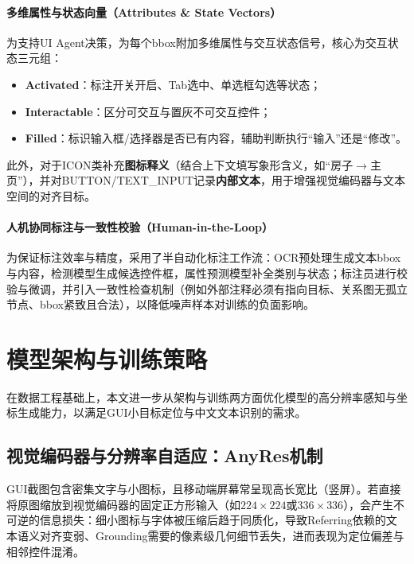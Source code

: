 \paragraph{多维属性与状态向量（Attributes \& State Vectors）}
为支持UI Agent决策，为每个bbox附加多维属性与交互状态信号，核心为交互状态三元组：
\begin{itemize}
  \item \textbf{Activated}：标注开关开启、Tab选中、单选框勾选等状态；
  \item \textbf{Interactable}：区分可交互与置灰不可交互控件；
  \item \textbf{Filled}：标识输入框/选择器是否已有内容，辅助判断执行“输入”还是“修改”。
\end{itemize}
此外，对于ICON类补充\textbf{图标释义}（结合上下文填写象形含义，如“房子$\rightarrow$主页”），并对BUTTON/TEXT\_INPUT记录\textbf{内部文本}，用于增强视觉编码器与文本空间的对齐目标。

\paragraph{人机协同标注与一致性校验（Human-in-the-Loop）}
为保证标注效率与精度，采用了半自动化标注工作流：OCR预处理生成文本bbox与内容，检测模型生成候选控件框，属性预测模型补全类别与状态；标注员进行校验与微调，并引入一致性检查机制（例如外部注释必须有指向目标、关系图无孤立节点、bbox紧致且合法），以降低噪声样本对训练的负面影响。

\section{模型架构与训练策略}
在数据工程基础上，本文进一步从架构与训练两方面优化模型的高分辨率感知与坐标生成能力，以满足GUI小目标定位与中文文本识别的需求。

\subsection{视觉编码器与分辨率自适应：AnyRes机制}
GUI截图包含密集文字与小图标，且移动端屏幕常呈现高长宽比（竖屏）。若直接将原图缩放到视觉编码器的固定正方形输入（如$224\times224$或$336\times336$），会产生不可逆的信息损失：细小图标与字体被压缩后趋于同质化，导致Referring依赖的文本语义对齐变弱、Grounding需要的像素级几何细节丢失，进而表现为定位偏差与相邻控件混淆。

